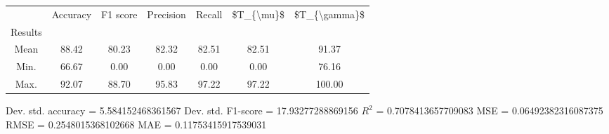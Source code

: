 \begin{tabular}{|c|c|c|c|c|c|c|}
\toprule
{} &  Accuracy &  F1 score &  Precision &  Recall &  \$T\_\{\textbackslash mu\}\$ &  \$T\_\{\textbackslash gamma\}\$ \\
Results &           &           &            &         &            &               \\
\hline
Mean    &     88.42 &     80.23 &      82.32 &   82.51 &      82.51 &         91.37 \\
Min.    &     66.67 &      0.00 &       0.00 &    0.00 &       0.00 &         76.16 \\
Max.    &     92.07 &     88.70 &      95.83 &   97.22 &      97.22 &        100.00 \\
\bottomrule
\end{tabular}

 Dev. std. accuracy = 5.584152468361567
 Dev. std. F1-score = 17.93277288869156
 $R^2$ = 0.7078413657709083
 MSE = 0.06492382316087375
 RMSE = 0.2548015368102668
 MAE = 0.11753415917539031